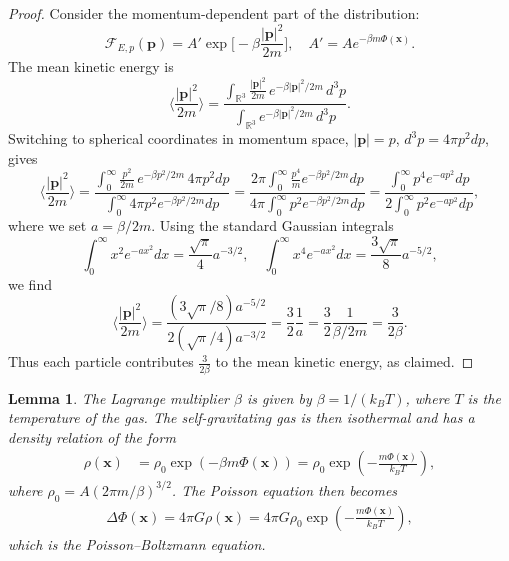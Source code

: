 \documentclass[12pt,a4paper]{article}
\newtheorem{lem}[thm]{Lemma}
\numberwithin{equation}{section}
\begin{document}
\begin{proof}
Consider the momentum-dependent part of the distribution:
\[
\mathcal{F}_{E,p}(\mathbf{p}) = A' \exp\Big[-\beta \frac{|\mathbf{p}|^2}{2m}\Big], \quad A' = A e^{-\beta m \Phi(\mathbf{x})}.
\]
The mean kinetic energy is
\[
\Big\langle \frac{|\mathbf{p}|^2}{2m} \Big\rangle
= \frac{\displaystyle \int_{\mathbb{R}^3} \frac{|\mathbf{p}|^2}{2m} \, e^{-\beta |\mathbf{p}|^2 / 2m} \, d^3p}{\displaystyle \int_{\mathbb{R}^3} e^{-\beta |\mathbf{p}|^2 / 2m} \, d^3p}.
\]
Switching to spherical coordinates in momentum space, $|\mathbf{p}| = p$, $d^3p = 4 \pi p^2 dp$, gives
\[
\Big\langle \frac{|\mathbf{p}|^2}{2m} \Big\rangle
= \frac{\displaystyle \int_0^\infty \frac{p^2}{2m} \, e^{-\beta p^2 / 2m} \, 4 \pi p^2 dp}{\displaystyle \int_0^\infty 4 \pi p^2 e^{-\beta p^2 / 2m} dp}
= \frac{\displaystyle 2 \pi \int_0^\infty \frac{p^4}{m} e^{-\beta p^2 / 2m} dp}{\displaystyle 4 \pi \int_0^\infty p^2 e^{-\beta p^2 / 2m} dp}
= \frac{\displaystyle \int_0^\infty p^4 e^{-a p^2} dp}{2 \displaystyle \int_0^\infty p^2 e^{-a p^2} dp},
\]
where we set $a = \beta / 2m$. Using the standard Gaussian integrals
\[
\int_0^\infty x^2 e^{-a x^2} dx = \frac{\sqrt{\pi}}{4} a^{-3/2}, \quad
\int_0^\infty x^4 e^{-a x^2} dx = \frac{3 \sqrt{\pi}}{8} a^{-5/2},
\]
we find
\[
\Big\langle \frac{|\mathbf{p}|^2}{2m} \Big\rangle
= \frac{(3 \sqrt{\pi}/8) a^{-5/2}}{2 (\sqrt{\pi}/4) a^{-3/2}}
= \frac{3}{2} \frac{1}{a}
= \frac{3}{2} \frac{1}{\beta / 2m}
= \frac{3}{2\beta}.
\]
Thus each particle contributes $\frac{3}{2\beta}$ to the mean kinetic energy, as claimed.
\end{proof}

\begin{lem}
The Lagrange multiplier $\beta$ is given by $\beta = 1 / (k_{B} T)$, where $T$ is the temperature of the gas. The self-gravitating gas is then isothermal and has a density relation of the form
\begin{align}
\rho(\mathbf{x}) &= \rho_{0} \exp(-\beta m \Phi(\mathbf{x}))
= \rho_{0} \exp\!\left(-\frac{m \Phi(\mathbf{x})}{k_{B} T}\right),
\end{align}
where $\rho_{0} = A (2\pi m / \beta)^{3/2}$. The Poisson equation then becomes
\begin{align}
\Delta \Phi(\mathbf{x}) = 4\pi G \rho(\mathbf{x})
= 4\pi G \rho_{0} \exp\!\left(-\frac{m \Phi(\mathbf{x})}{k_{B} T}\right),
\end{align}
which is the Poisson--Boltzmann equation.
\end{lem}
\end{document}

